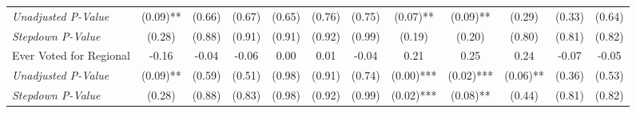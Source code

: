 \begin{tabular}{l c c c c c c c c c c c}
\quad \textit{Unadjusted P-Value} & (0.09)** & (0.66) & (0.67) & (0.65) & (0.76) & (0.75) & (0.07)** & (0.09)** & (0.29) & (0.33) & (0.64) \\
\quad \textit{Stepdown P-Value} & (0.28) & (0.88) & (0.91) & (0.91) & (0.92) & (0.99) & (0.19) & (0.20) & (0.80) & (0.81) & (0.82) \\
Ever Voted for Regional & -0.16 & -0.04 & -0.06 & 0.00 & 0.01 & -0.04 & 0.21 & 0.25 & 0.24 & -0.07 & -0.05 \\
\quad \textit{Unadjusted P-Value} & (0.09)** & (0.59) & (0.51) & (0.98) & (0.91) & (0.74) & (0.00)*** & (0.02)*** & (0.06)** & (0.36) & (0.53) \\
\quad \textit{Stepdown P-Value} & (0.28) & (0.88) & (0.83) & (0.98) & (0.92) & (0.99) & (0.02)*** & (0.08)** & (0.44) & (0.81) & (0.82) \\
\bottomrule
\end{tabular}
